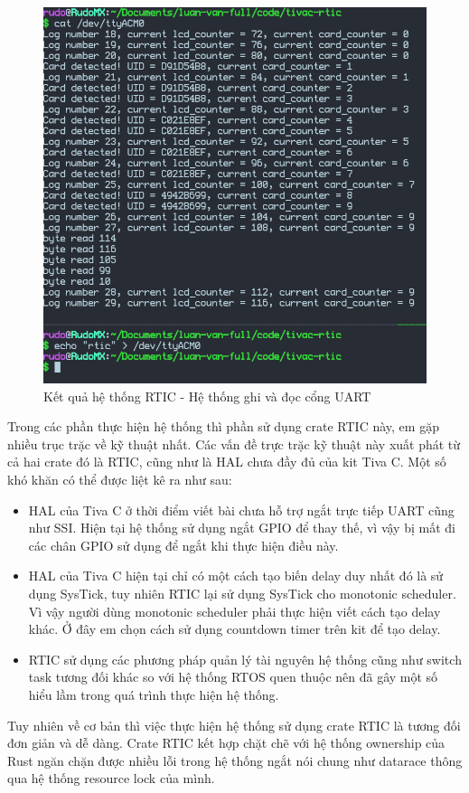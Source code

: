 \begin{figure}[ht]
\centering
\includegraphics[scale=0.5]{images/rtic_uart.png}
\caption{Kết quả hệ thống RTIC - Hệ thống ghi và đọc cổng UART}
\label{fig:rtic_uart}
\end{figure}

\clearpage
Trong các phần thực hiện hệ thống thì phần sử dụng crate RTIC này, em gặp nhiều trục trặc về kỹ thuật nhất.
Các vấn đề trực trặc kỹ thuật này xuất phát từ cả hai crate đó là RTIC, cũng như là HAL chưa đầy đủ của kit Tiva C.
Một số khó khăn có thể được liệt kê ra như sau:
\begin{itemize}
    \item HAL của Tiva C ở thời điểm viết bài chưa hỗ trợ ngắt trực tiếp UART cũng như SSI.
        Hiện tại hệ thống sử dụng ngắt GPIO để thay thế, vì vậy bị mất đi các chân GPIO sử dụng để ngắt khi thực hiện điều này.
    \item HAL của Tiva C hiện tại chỉ có một cách tạo biến delay duy nhất đó là sử dụng SysTick, tuy nhiên RTIC lại sử dụng SysTick cho monotonic scheduler.
        Vì vậy người dùng monotonic scheduler phải thực hiện viết cách tạo delay khác.
        Ở đây em chọn cách sử dụng countdown timer trên kit để tạo delay.
    \item RTIC sử dụng các phương pháp quản lý tài nguyên hệ thống cũng như switch task tương đối khác so với hệ thống RTOS quen thuộc nên đã gây một số hiểu lầm trong quá trình thực hiện hệ thống.
\end{itemize}

Tuy nhiên về cơ bản thì việc thực hiện hệ thống sử dụng crate RTIC là tương đối đơn giản và dễ dàng.
Crate RTIC kết hợp chặt chẽ với hệ thống ownership của Rust ngăn chặn được nhiều lỗi trong hệ thống ngắt nói chung như datarace thông qua hệ thống resource lock của mình.
